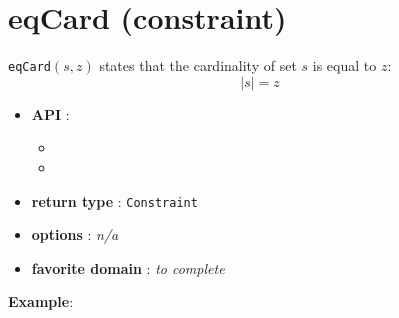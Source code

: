 \label{eqcard}
\hypertarget{eqcard}{}

\section{eqCard (constraint)}\label{eqcard:eqcardconstraint}\hypertarget{eqcard:eqcardconstraint}{}
\begin{notedef}
  \texttt{eqCard}$(s,z)$ states that the cardinality of set $s$ is equal to $z$:
$$|s| = z$$
\end{notedef}

\begin{itemize}
	\item \textbf{API} :
	\begin{itemize}
		\item {}
		\item {}
	\end{itemize}
	\item \textbf{return type} : \texttt{Constraint}
	\item \textbf{options} : \emph{n/a}
	\item \textbf{favorite domain} : \emph{to complete}
\end{itemize}

\textbf{Example}:

